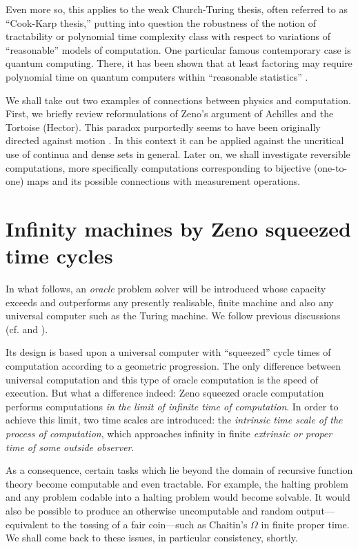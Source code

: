Even more so, this applies  to the weak Church-Turing thesis, often
referred to as ``Cook-Karp thesis,'' putting into question the
robustness of the notion of tractability or polynomial time complexity
class
with respect to variations of ``reasonable'' models of computation.
One particular famous contemporary case is quantum computing.
There, it has been shown that at least factoring may require polynomial
time on quantum computers within
``reasonable statistics'' \cite{shor:94,ekerj96}.

We shall take out two examples of connections between physics and
computation. First, we briefly review reformulations of Zeno's argument
of Achilles
and the Tortoise (Hector). This paradox purportedly seems to have been
originally directed against motion \cite{zeno,ki-57,gruenbaum:68}.
In this context it can be applied against the uncritical
use of continua and dense sets in general.
Later on, we
shall investigate reversible
computations, more specifically computations corresponding to
bijective (one-to-one)
maps and its possible connections with measurement operations.


\section{Infinity machines by Zeno squeezed time cycles}

In what follows, an
{\em oracle} problem
 solver will be introduced
whose capacity exceeds  and outperforms any presently
 realisable, finite machine and also  any
 universal computer such as the Turing machine. We follow
previous discussions
(cf. \cite[pp. 24-27]{svozil-93} and
\cite{svozil-nat-acad,svozil-complexity:95,svozil-set,maryland}).

 Its
 design is based upon
 a universal computer with ``squeezed'' cycle times of
 computation according to a geometric progression.
 The only difference
between universal computation
 and this type of
 oracle computation is the speed of execution. But what a difference
indeed: Zeno squeezed oracle
 computation performs
 computations {\em in the limit of infinite time of computation}.
 In order to achieve this limit,
 two time scales are introduced: the {\em intrinsic time scale
 of the process of computation}, which approaches infinity in finite
{\em
 extrinsic or proper time of some outside observer}.

As a consequence, certain tasks which lie beyond the domain of recursive
function theory  become computable and even tractable. For example, the
halting problem
and any problem codable into a halting problem would become solvable.
It would also be possible to produce an otherwise
 uncomputable and random output---equivalent to the tossing of a fair
 coin---such as Chaitin's $\Omega$ \cite{chaitin:92,calude:94}
 in finite proper time. We shall come back to these issues, in
particular consistency, shortly.

